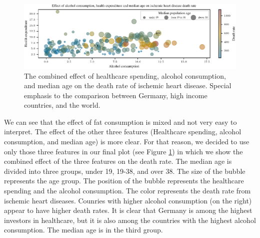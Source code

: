 \begin{figure}[ht]
    \vskip 0.2in
    \centering
    \centerline{\includegraphics[]{fig/fig_bubble_plot_factors.pdf}}
    \caption{The combined effect of healthcare spending, alcohol consumption, and median age on the death rate of ischemic heart disease. Special 
        emphasis to the comparison between Germany, high income countries, and the world.}
    \label{bubble_plot_factors}
\end{figure}

We can see that the effect of fat consumption is mixed and not very easy to interpret. The effect of the other three features 
(Healthcare spending, alcohol consumption, and median age) is more clear. For that reason, we decided to use only those three features in our final plot 
(see Figure \ref{bubble_plot_factors}) in which we show the combined effect of the three features on the death rate. The median age is divided into three 
groups, under 19, 19-38, and over 38. The size of the bubble represents the age group. The position of the bubble represents the healthcare spending and
the alcohol consumption. The color represents the death rate from ischemic heart diseases. 
Counries with higher alcohol consumption (on the right) appear to have higher death rates.
It is clear that Germany is among the highest investors in healthcare, but it is also among the countries with the highest alcohol consumption. The median age
is in the third group.

